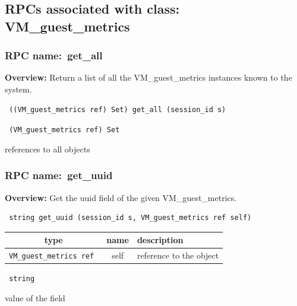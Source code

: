 \subsection{RPCs associated with class: VM\_guest\_metrics}
\subsubsection{RPC name:~get\_all}

{\bf Overview:} 
Return a list of all the VM\_guest\_metrics instances known to the system.

\begin{verbatim} ((VM_guest_metrics ref) Set) get_all (session_id s)\end{verbatim}


\vspace{0.3cm}

{\tt 
(VM\_guest\_metrics ref) Set
}


references to all objects
\vspace{0.3cm}
\vspace{0.3cm}
\vspace{0.3cm}
\subsubsection{RPC name:~get\_uuid}

{\bf Overview:} 
Get the uuid field of the given VM\_guest\_metrics.

\begin{verbatim} string get_uuid (session_id s, VM_guest_metrics ref self)\end{verbatim}



 
\vspace{0.3cm}
\begin{tabular}{|c|c|p{7cm}|}
 \hline
{\bf type} & {\bf name} & {\bf description} \\ \hline
{\tt VM\_guest\_metrics ref } & self & reference to the object \\ \hline 

\end{tabular}

\vspace{0.3cm}

{\tt 
string
}


value of the field
\vspace{0.3cm}
\vspace{0.3cm}
\vspace{0.3cm}
